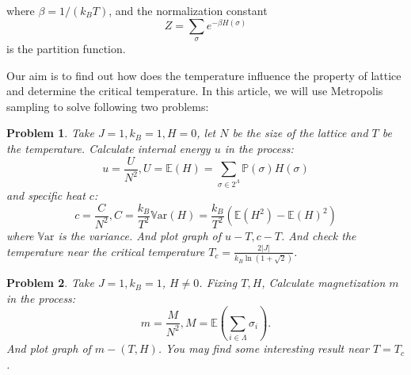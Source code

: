\documentclass[11pt,openany]{book}              %
\newtheorem{problem}{Problem}
\begin{document}
where \( \beta =1/(k_{B}T)\), and the normalization constant
\[ Z=\sum _{\sigma }e^{-\beta H(\sigma )}\]
is the partition function.

Our aim is to find out how does the temperature influence the property of lattice and determine the critical temperature.
In this article, we will use Metropolis sampling to solve following two problems:

\begin{problem}\label{pro:1}
Take \(J=1, k_B=1, H=0\), let \(N\) be the size of the lattice and \(T\) be the temperature.
Calculate internal energy \(u\) in the process:
\begin{equation}
	u=\frac{U}{N^2},U=\mathbb{E}(H)=\sum_{\sigma\in 2^\Lambda}\mathbb{P}(\sigma)H( \sigma)
\end{equation}
and specific heat \(c\):
\begin{equation}
	c=\frac{C}{N^2}, C=\frac{k_B}{T^2}\mathbb{V}\mathrm{ar}(H)=\frac{k_B}{T^2}( \mathbb{E}( H^2)-\mathbb{E}( H)^2)
\end{equation}
where \(\mathbb{V}\mathrm{ar}\) is the variance.
And plot graph of \(u-T, c-T\).
And check the temperature near the critical temperature \(T_c = \frac{2| J|}{k_B \ln ( 1+\sqrt{2})}\).

\end{problem}
\begin{problem}\label{pro:2}
Take \(J=1, k_B=1\), \(H \neq 0\). Fixing \(T, H\),
Calculate magnetization \(m\) in the process:
\begin{equation}
	m=\frac{M}{N^2}, M=\mathbb{E}(\sum_{i \in \Lambda} \sigma_i ).
\end{equation}
And plot graph of \(m-(T, H)\). You may find some interesting result near \(T = T_c\).

\end{problem}
\end{document}
